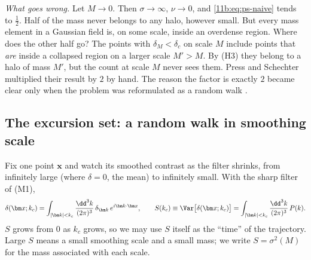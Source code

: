 \emph{What goes wrong.} Let $M\to0$. Then $\sigma\to\infty$, $\nu\to0$, and
\eqref{11b:eq:ps-naive} tends to $\tfrac12$. Half of the mass never belongs to any
halo, however small. But every mass element in a Gaussian field is, on some
scale, inside an overdense region. Where does the other half go? The points with
$\delta_M<\delta_c$ on scale $M$ include points that \emph{are} inside a collapsed
region on a larger scale $M'>M$. By (H3) they belong to a halo of mass $M'$, but
the count at scale $M$ never sees them. Press and Schechter multiplied their result
by $2$ by hand. The reason the factor is exactly $2$ became clear only when the
problem was reformulated as a random walk \cite{BCEK1991}.

\subsection{The excursion set: a random walk in smoothing scale}
\label{11b:sec:excursion}

Fix one point $\bm x$ and watch its smoothed contrast as the filter shrinks, from
infinitely large (where $\delta=0$, the mean) to infinitely small. With the sharp
filter of (M1),
\begin{equation}
  \delta(\bm x;k_c)=\int_{|\bm k|<k_c}\frac{\dd^3k}{(2\pi)^3}\,
     \delta_{\bm k}\,e^{i\bm k\cdot\bm x},
  \qquad
  S(k_c)\equiv\Var\bigl[\delta(\bm x;k_c)\bigr]
  =\int_{|\bm k|<k_c}\frac{\dd^3k}{(2\pi)^3}\,P(k).
  \label{11b:eq:sharpk}
\end{equation}
$S$ grows from $0$ as $k_c$ grows, so we may use $S$ itself as the ``time'' of the
trajectory. Large $S$ means a small smoothing scale and a small mass; we write
$S=\sigma^2(M)$ for the mass associated with each scale.

